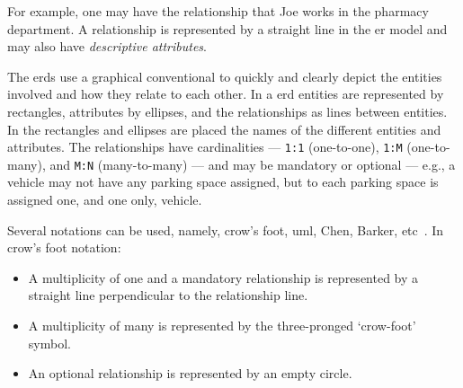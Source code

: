 \begin{itemize}
  For example, one may have the relationship that Joe works in the pharmacy
  department.
  A relationship is represented by a straight line in the \gls{er} model and may
  also have \emph{descriptive attributes}.
\end{itemize}

The \glspl{erd} use a graphical conventional to quickly and clearly depict the
entities involved and how they relate to each other. In a \gls{erd} entities are
represented by rectangles, attributes by ellipses, and the relationships as
lines between entities. In the rectangles and ellipses are placed the names of
the different entities and attributes. The relationships have cardinalities --- \texttt{1:1}
(one-to-one), \texttt{1:M} (one-to-many), and \texttt{M:N} (many-to-many) ---
and may be mandatory or optional --- e.g., a vehicle may not have any parking
space assigned, but to each parking space is assigned one, and one only,
vehicle.

Several notations can be used, namely, crow's foot, \gls{uml}, Chen, Barker,
etc~\cite{crowsfootNotation}.
In crow's foot notation:
\begin{itemize}
\item A multiplicity of one and a mandatory relationship is represented by a
  straight line perpendicular to the relationship line.
\item A multiplicity of many is represented by the three-pronged `crow-foot'
  symbol.
\item An optional relationship is represented by an empty circle.
\end{itemize}

